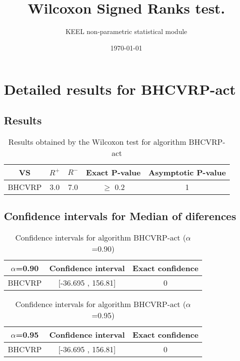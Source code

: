 \documentclass[a4paper,10pt]{article}
\title{Wilcoxon Signed Ranks test.}
\date{\today}
\author{KEEL non-parametric statistical module}
\begin{document}
\pagestyle{empty}
\maketitle
\thispagestyle{empty}



\section{Detailed results for BHCVRP-act}


\subsection{Results}

\begin{table}[!htp]
\centering\small
\begin{tabular}{
|c|c|c|c|c|}
\hline
 VS & $R^{+}$ & $R^{-}$ & Exact P-value & Asymptotic P-value \\ \hline 
BHCVRP & 3.0 & 7.0 & $\geq$ 0.2 & 1\\ \hline 

\end{tabular}
\caption{Results obtained by the Wilcoxon test for algorithm BHCVRP-act}
\end{table}

\subsection{Confidence intervals for Median of diferences}

\begin{table}[!htp]
\centering\small
\begin{tabular}{
|c|c|c|}
\hline
 $\alpha$=0.90 & Confidence interval & Exact confidence \\ \hline 
BHCVRP & [-36.695 , 156.81] & 0\\ \hline 

\end{tabular}
\caption{Confidence intervals for algorithm BHCVRP-act ($\alpha$=0.90)}
\end{table}
\begin{table}[!htp]
\centering\small
\begin{tabular}{
|c|c|c|}
\hline
 $\alpha$=0.95 & Confidence interval & Exact confidence \\ \hline 
BHCVRP & [-36.695 , 156.81] & 0\\ \hline 

\end{tabular}
\caption{Confidence intervals for algorithm BHCVRP-act ($\alpha$=0.95)}
\end{table}
\end{document}
